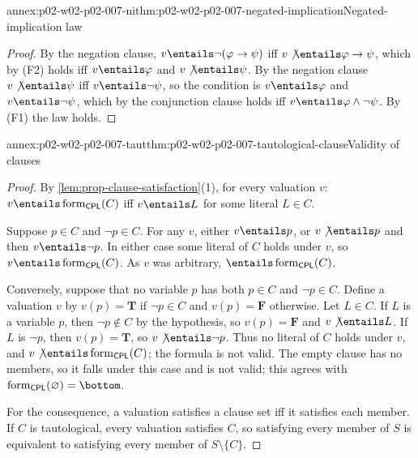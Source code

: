 \begin{annexitem}{annex:p02-w02-p02-007-ni}{thm:p02-w02-p02-007-negated-implication}{Negated-implication law}
\begin{proof}
By the negation clause, \(v\entails\neg(\varphi\to\psi)\) iff
\(v\not\entails\varphi\to\psi\), which by (F2) holds iff
\(v\entails\varphi\) and \(v\not\entails\psi\).  By the negation clause
\(v\not\entails\psi\) iff \(v\entails\neg\psi\), so the condition is
\(v\entails\varphi\) and \(v\entails\neg\psi\), which by the conjunction
clause holds iff \(v\entails\varphi\land\neg\psi\).  By (F1) the law holds.
\end{proof}
\end{annexitem}

\begin{annexitem}{annex:p02-w02-p02-007-taut}{thm:p02-w02-p02-007-tautological-clause}{Validity of clauses}
\begin{proof}
By \cref{lem:prop-clause-satisfaction}(1), for every valuation \(v\):
\(v\entails\operatorname{form}_{\mathsf{CPL}}(C)\) iff \(v\entails L\)
for some literal \(L\in C\).

Suppose \(p\in C\) and \(\neg p\in C\).  For any \(v\), either
\(v\entails p\), or \(v\not\entails p\) and then \(v\entails\neg p\).  In
either case some literal of \(C\) holds under \(v\), so
\(v\entails\operatorname{form}_{\mathsf{CPL}}(C)\).  As \(v\) was
arbitrary, \(\entails\operatorname{form}_{\mathsf{CPL}}(C)\).

Conversely, suppose that no variable \(p\) has both \(p\in C\) and
\(\neg p\in C\).  Define a valuation \(v\) by \(v(p)=\mathbf T\) if
\(\neg p\in C\) and \(v(p)=\mathbf F\) otherwise.  Let \(L\in C\).  If \(L\)
is a variable \(p\), then \(\neg p\notin C\) by the hypothesis, so
\(v(p)=\mathbf F\) and \(v\not\entails L\).  If \(L\) is \(\neg p\), then
\(v(p)=\mathbf T\), so \(v\not\entails\neg p\).  Thus no literal of \(C\)
holds under \(v\), and \(v\not\entails\operatorname{form}_{\mathsf{CPL}}(C)\);
the formula is not valid.  The empty clause has no members, so it falls
under this case and is not valid; this agrees with
\(\operatorname{form}_{\mathsf{CPL}}(\varnothing)=\bottom\).

For the consequence, a valuation satisfies a clause set iff it satisfies
each member.  If \(C\) is tautological, every valuation satisfies \(C\), so
satisfying every member of \(S\) is equivalent to satisfying every member of
\(S\setminus\{C\}\).
\end{proof}
\end{annexitem}

